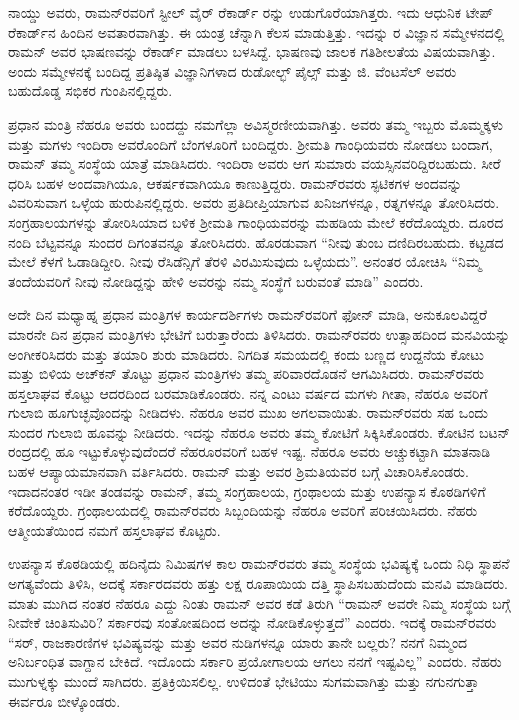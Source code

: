 ನಾಯ್ಡು ಅವರು, ರಾಮನ್‍ರವರಿಗೆ ಸ್ಟೀಲ್ ವೈರ್ ರೆಕಾರ್ಡ್ ರನ್ನು ಉಡುಗೊರೆಯಾಗಿತ್ತರು. ಇದು ಆಧುನಿಕ ಟೇಪ್ ರೆಕಾರ್ಡ್‌ನ ಹಿಂದಿನ ಅವತಾರವಾಗಿತ್ತು. ಈ ಯಂತ್ರ ಚೆನ್ನಾಗಿ ಕೆಲಸ ಮಾಡುತ್ತಿತ್ತು. ಇದನ್ನು ರ ವಿಜ್ಞಾನ ಸಮ್ಮೇಳನದಲ್ಲಿ ರಾಮನ್ ಅವರ ಭಾಷಣವನ್ನು ರೆಕಾರ್ಡ್ ಮಾಡಲು ಬಳಸಿದ್ದೆ. ಭಾಷಣವು ಜಾಲಕ ಗತಿಶೀಲತೆಯ ವಿಷಯವಾಗಿತ್ತು. ಅಂದು ಸಮ್ಮೇಳನಕ್ಕೆ ಬಂದಿದ್ದ ಪ್ರತಿಷ್ಠಿತ ವಿಜ್ಞಾನಿಗಳಾದ ರುಡೋಲ್ಭ್ ಪೈಲ್ಸ್ ಮತ್ತು ಜಿ. ವೆಂಟಸೆಲ್ ಅವರು ಬಹುದೊಡ್ಡ ಸಭಿಕರ ಗುಂಪಿನಲ್ಲಿದ್ದರು.



ಪ್ರಧಾನ ಮಂತ್ರಿ ನೆಹರೂ ಅವರು ಬಂದದ್ದು ನಮಗೆಲ್ಲಾ ಅವಿಸ್ಮರಣೀಯವಾಗಿತ್ತು. ಅವರು ತಮ್ಮ ಇಬ್ಬರು ಮೊಮ್ಮಕ್ಕಳು ಮತ್ತು ಮಗಳು ಇಂದಿರಾ ಅವರೊಂದಿಗೆ ಬೆಂಗಳೂರಿಗೆ ಬಂದಿದ್ದರು. ಶ‍್ರೀಮತಿ ಗಾಂಧಿಯವರು ನೋಡಲು ಬಂದಾಗ, ರಾಮನ್ ತಮ್ಮ ಸಂಸ್ಥೆಯ ಯಾತ್ರೆ ಮಾಡಿಸಿದರು. ಇಂದಿರಾ ಅವರು ಆಗ ಸುಮಾರು  ವಯಸ್ಸಿನವರಿದ್ದಿರಬಹುದು. ಸೀರೆ ಧರಿಸಿ ಬಹಳ ಅಂದವಾಗಿಯೂ, ಆಕರ್ಷಕವಾಗಿಯೂ ಕಾಣುತ್ತಿದ್ದರು. ರಾಮನ್‍ರವರು ಸ್ಫಟಿಕಗಳ ಅಂದವನ್ನು ವಿವರಿಸುವಾಗ ಒಳ್ಳೆಯ ಹುರುಪಿನಲ್ಲಿದ್ದರು. ಅವರು ಪ್ರತಿದೀಪ್ತಿಯಾಗುವ ಖನಿಜಗಳನ್ನೂ, ರತ್ನಗಳನ್ನೂ ತೋರಿಸಿದರು. ಸಂಗ್ರಹಾಲಯಗಳನ್ನು ತೋರಿಸಿಯಾದ ಬಳಿಕ ಶ‍್ರೀಮತಿ ಗಾಂಧಿಯವರನ್ನು ಮಹಡಿಯ ಮೇಲೆ ಕರೆದೊಯ್ದರು. ದೂರದ ನಂದಿ ಬೆಟ್ಟವನ್ನೂ ಸುಂದರ ದಿಗಂತವನ್ನೂ ತೋರಿಸಿದರು. ಹೊರಡುವಾಗ “ನೀವು ತುಂಬ ದಣಿದಿರಬಹುದು. ಕಟ್ಟಡದ ಮೇಲೆ ಕೆಳಗೆ ಓಡಾಡಿದ್ದೀರಿ. ನೀವು ರೆಸಿಡೆನ್ಸಿಗೆ ತೆರಳಿ ವಿರಮಿಸುವುದು ಒಳ್ಳೆಯದು”. ಅನಂತರ ಯೋಚಿಸಿ “ನಿಮ್ಮ ತಂದೆಯವರಿಗೆ ನೀವು ನೋಡಿದ್ದನ್ನು ಹೇಳಿ ಅವರನ್ನು ನಮ್ಮ ಸಂಸ್ಥೆಗೆ ಬರುವಂತೆ ಮಾಡಿ” ಎಂದರು.

ಅದೇ ದಿನ ಮಧ್ಯಾಹ್ನ ಪ್ರಧಾನ ಮಂತ್ರಿಗಳ ಕಾರ್ಯದರ್ಶಿಗಳು ರಾಮನ್‍ರವರಿಗೆ ಫೋನ್ ಮಾಡಿ, ಅನುಕೂಲವಿದ್ದರೆ ಮಾರನೇ ದಿನ ಪ್ರಧಾನ ಮಂತ್ರಿಗಳು ಭೇಟಿಗೆ ಬರುತ್ತಾರೆಂದು ತಿಳಿಸಿದರು. ರಾಮನ್‍ರವರು ಉತ್ಸಾಹದಿಂದ ಮನವಿಯನ್ನು ಅಂಗೀಕರಿಸಿದರು ಮತ್ತು ತಯಾರಿ ಶುರು ಮಾಡಿದರು. ನಿಗದಿತ ಸಮಯದಲ್ಲಿ ಕಂದು ಬಣ್ಣದ ಉದ್ದನೆಯ ಕೋಟು ಮತ್ತು ಬಿಳಿಯ ಅಚ್‍ಕನ್ ತೊಟ್ಟು ಪ್ರಧಾನ ಮಂತ್ರಿಗಳು ತಮ್ಮ ಪರಿವಾರದೊಡನೆ ಆಗಮಿಸಿದರು. ರಾಮನ್‍ರವರು ಹಸ್ತಲಾಘವ ಕೊಟ್ಟು ಆದರದಿಂದ ಬರಮಾಡಿಕೊಂಡರು. ನನ್ನ ಎಂಟು ವರ್ಷದ ಮಗಳು ಗೀತಾ, ನೆಹರೂ ಅವರಿಗೆ ಗುಲಾಬಿ ಹೂಗುಚ್ಛವೊಂದನ್ನು ನೀಡಿದಳು. ನೆಹರೂ ಅವರ ಮುಖ ಅಗಲವಾಯಿತು. ರಾಮನ್‍ರವರು ಸಹ ಒಂದು ಸುಂದರ ಗುಲಾಬಿ ಹೂವನ್ನು ನೀಡಿದರು. ಇದನ್ನು ನೆಹರೂ ಅವರು ತಮ್ಮ ಕೋಟಿಗೆ ಸಿಕ್ಕಿಸಿಕೊಂಡರು. ಕೋಟಿನ ಬಟನ್ ರಂದ್ರದಲ್ಲಿ ಹೂ ಇಟ್ಟುಕೊಳ್ಳುವುದೆಂದರೆ ನೆಹರೂರವರಿಗೆ ಬಹಳ ಇಷ್ಟ. ನೆಹರೂ ಅವರು ಅಚ್ಚುಕಟ್ಟಾಗಿ ಮಾತನಾಡಿ ಬಹಳ ಆಪ್ಯಾಯಮಾನವಾಗಿ ವರ್ತಿಸಿದರು. ರಾಮನ್ ಮತ್ತು ಅವರ ಶ್ರಿಮತಿಯವರ ಬಗ್ಗೆ ವಿಚಾರಿಸಿಕೊಂಡರು. ಇದಾದನಂತರ ಇಡೀ ತಂಡವನ್ನು ರಾಮನ್, ತಮ್ಮ ಸಂಗ್ರಹಾಲಯ, ಗ್ರಂಥಾಲಯ ಮತ್ತು ಉಪನ್ಯಾಸ ಕೊಠಡಿಗಳಿಗೆ ಕರೆದೊಯ್ದರು. ಗ್ರಂಥಾಲಯದಲ್ಲಿ ರಾಮನ್‍ರವರು ಸಿಬ್ಬಂದಿಯನ್ನು ನೆಹರೂ ಅವರಿಗೆ ಪರಿಚಯಿಸಿದರು. ನೆಹರು ಆತ್ಮೀಯತೆಯಿಂದ ನಮಗೆ ಹಸ್ತಲಾಘವ ಕೊಟ್ಟರು.

ಉಪನ್ಯಾಸ ಕೊಠಡಿಯಲ್ಲಿ ಹದಿನೈದು ನಿಮಿಷಗಳ ಕಾಲ ರಾಮನ್‍ರವರು ತಮ್ಮ ಸಂಸ್ಥೆಯ ಭವಿಷ್ಯಕ್ಕೆ ಒಂದು ನಿಧಿ ಸ್ಥಾಪನೆ ಅಗತ್ಯವೆಂದು ತಿಳಿಸಿ, ಅದಕ್ಕೆ ಸರ್ಕಾರದವರು ಹತ್ತು ಲಕ್ಷ ರೂಪಾಯಿಯ ದತ್ತಿ ಸ್ಥಾಪಿಸಬಹುದೆಂದು ಮನವಿ ಮಾಡಿದರು. ಮಾತು ಮುಗಿದ ನಂತರ ನೆಹರೂ ಎದ್ದು ನಿಂತು ರಾಮನ್ ಅವರ ಕಡೆ ತಿರುಗಿ \enginline{-} “ರಾಮನ್ ಅವರೇ ನಿಮ್ಮ ಸಂಸ್ಥೆಯ ಬಗ್ಗೆ ನೀವೇಕೆ ಚಿಂತಿಸುವಿರಿ? ಸರ್ಕಾರವು ಸಂತೋಷದಿಂದ ಅದನ್ನು ನೋಡಿಕೊಳ್ಳುತ್ತದೆ” ಎಂದರು. ಇದಕ್ಕೆ ರಾಮನ್‍ರವರು\enginline{-} “ಸರ್, ರಾಜಕಾರಣಿಗಳ ಭವಿಷ್ಯವನ್ನು ಮತ್ತು ಅವರ ನುಡಿಗಳನ್ನೂ ಯಾರು ತಾನೇ ಬಲ್ಲರು? ನನಗೆ ನಿಮ್ಮಂದ ಅನಿರ್ಬಂಧಿತ ವಾಗ್ದಾನ ಬೇಕಿದೆ. ಇದೊಂದು ಸರ್ಕಾರಿ ಪ್ರಯೋಗಾಲಯ ಆಗಲು ನನಗೆ ಇಷ್ಟವಿಲ್ಲ” ಎಂದರು. ನೆಹರು ಮುಗುಳ್ನಕ್ಕು ಮುಂದೆ ಸಾಗಿದರು. ಪ್ರತಿಕ್ರಿಯಿಸಲಿಲ್ಲ. ಉಳಿದಂತೆ ಭೇಟಿಯು ಸುಗಮವಾಗಿತ್ತು ಮತ್ತು ನಗುನಗುತ್ತಾ ಈರ್ವರೂ ಬೀಳ್ಕೊಂಡರು.

